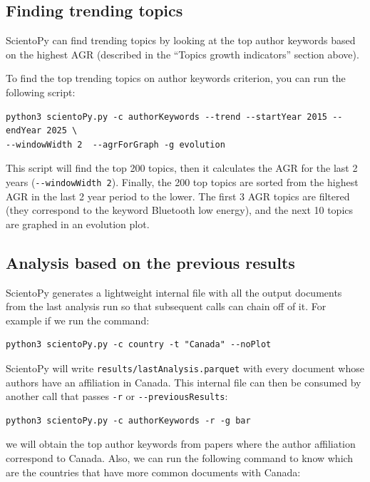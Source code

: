 \documentclass[10pt,letterpaper]{article}
\begin{document}
\subsection{Finding trending topics}

ScientoPy can find trending topics by looking at the top author keywords based on the highest AGR (described in the ``Topics growth indicators'' section above).

To find the top trending topics on author keywords criterion, you can run the following script:

\begin{verbatim}
python3 scientoPy.py -c authorKeywords --trend --startYear 2015 --endYear 2025 \
--windowWidth 2  --agrForGraph -g evolution
\end{verbatim}

This script will find the top 200 topics, then it calculates the AGR for the last 2 years (\verb|--windowWidth 2|). Finally, the 200 top topics are sorted from the highest AGR in the last 2 year period to the lower. The first 3 AGR topics are filtered (they correspond to the keyword Bluetooth low energy), and the next 10 topics are graphed in an evolution plot.

\subsection{Analysis based on the previous results}

ScientoPy generates a lightweight internal file with all the output documents from the last analysis run so that subsequent calls can chain off of it. For example if we run the command:

\begin{verbatim}
python3 scientoPy.py -c country -t "Canada" --noPlot
\end{verbatim}

ScientoPy will write \verb|results/lastAnalysis.parquet| with every document whose authors have an affiliation in Canada. This internal file can then be consumed by another call that passes  \verb|-r| or \verb|--previousResults|:

\begin{verbatim}
python3 scientoPy.py -c authorKeywords -r -g bar
\end{verbatim}

we will obtain the top author keywords from papers where the author affiliation correspond to Canada. Also, we can run the following command to know which are the countries that have more common documents with Canada:
\end{document}
